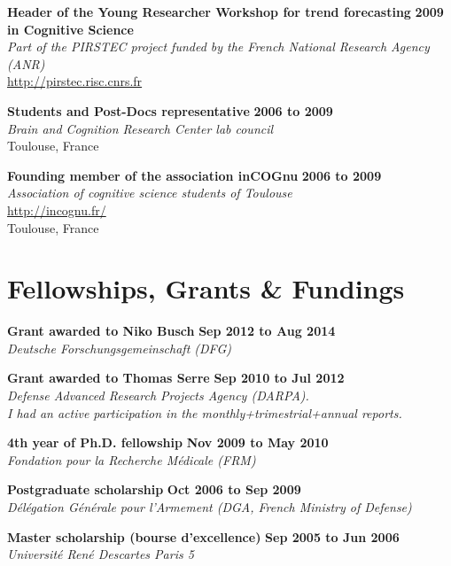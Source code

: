 \documentclass[margin,line]{resume}
\begin{document}
\begin{resume}
	\textbf{Header of the Young Researcher Workshop for trend forecasting} \hfill \textbf{2009}\\
	 \textbf{in Cognitive Science}\\
	\textsl{Part of the PIRSTEC project funded by the French National Research Agency (ANR)}\\
	 \url{http://pirstec.risc.cnrs.fr}

	\textbf{Students and Post-Docs representative} \hfill \textbf{2006 to 2009}\\
	\textsl{Brain and Cognition Research Center lab council}\\
	Toulouse, France	

	\textbf{Founding member of the association inCOGnu} \hfill \textbf{2006 to 2009}\\
	\textsl{Association of cognitive science students of Toulouse}\\
	 \url{http://incognu.fr/}\\
	Toulouse, France


	\vspace{3mm}
	\section{\mysidestyle Fellowships, Grants \& Fundings}

	\textbf{Grant awarded to Niko Busch} \hfill \textbf{Sep 2012 to Aug 2014}\\
	\textsl{Deutsche Forschungsgemeinschaft (DFG)}

	\textbf{Grant awarded to Thomas Serre} \hfill \textbf{Sep 2010 to Jul 2012}\\
	\textsl{Defense Advanced Research Projects Agency (DARPA).\\ I had an active participation in the monthly+trimestrial+annual reports.}
	
	\textbf{4th year of Ph.D. fellowship} \hfill \textbf{Nov 2009 to May 2010}\\
	\textsl{Fondation pour la Recherche Médicale (FRM)}

	\textbf{Postgraduate scholarship} \hfill \textbf{Oct 2006 to Sep 2009}\\ %
	\textsl{Délégation Générale pour l'Armement (DGA, French Ministry of Defense)}

	\textbf{Master scholarship (bourse d’excellence)} \hfill \textbf{Sep 2005 to Jun 2006}\\
	\textsl{Université René Descartes Paris 5}




\end{resume}
\end{document}

